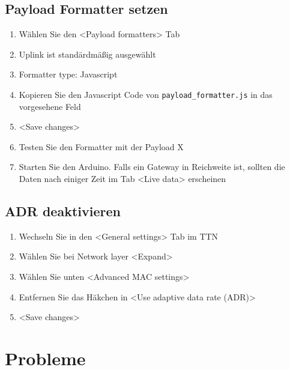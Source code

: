 \documentclass[12pt]{article}
\begin{document}
    \subsection{Payload Formatter setzen} \label{subsec:Payload Formatter setzen}
      \begin{enumerate}
        \item Wählen Sie den \textless Payload formatters\textgreater{} Tab
        \item Uplink ist standärdmäßig ausgewählt
        \item Formatter type: Javascript
        \item Kopieren Sie den Javascript Code von \texttt{payload\_formatter.js} in das vorgesehene Feld
        \item \textless Save changes\textgreater{}
        \item Testen Sie den Formatter mit der Payload X %
        \item Starten Sie den Arduino. Falls ein Gateway in Reichweite ist, sollten die Daten nach einiger
          Zeit im Tab \textless Live data\textgreater{} erscheinen
      \end{enumerate}


    \subsection{ADR deaktivieren} \label{subsec:ADR deaktivieren}
      \begin{enumerate}
        \item Wechseln Sie in den \textless General settings\textgreater{} Tab im TTN
        \item Wählen Sie bei Network layer \textless Expand\textgreater{}
        \item Wählen Sie unten \textless Advanced MAC settings\textgreater{}
        \item Entfernen Sie das Häkchen in \textless Use adaptive data rate (ADR)\textgreater{}
        \item \textless Save changes\textgreater{}
      \end{enumerate}

  \section{Probleme}
\end{document}
